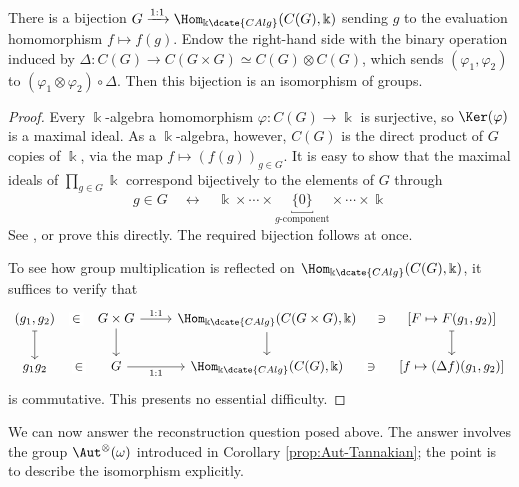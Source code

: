 \begin{lemma}\label{prop:CG-group}
	There is a bijection $G\xrightarrow{1:1}\Hom_{\Bbbk\dcate{CAlg}}(C(G),\Bbbk)$ sending $g$ to the evaluation homomorphism $f\mapsto f(g)$. Endow the right-hand side with the binary operation induced by $\Delta:C(G)\to C(G\times G)\simeq C(G)\otimes C(G)$, which sends $(\varphi_1,\varphi_2)$ to $(\varphi_1\otimes\varphi_2)\circ\Delta$. Then this bijection is an isomorphism of groups.
\end{lemma}
\begin{proof}
	Every $\Bbbk$-algebra homomorphism $\varphi:C(G)\to\Bbbk$ is surjective, so $\Ker(\varphi)$ is a maximal ideal. As a $\Bbbk$-algebra, however, $C(G)$ is the direct product of $G$ copies of $\Bbbk$, via the map $f\mapsto(f(g))_{g\in G}$. It is easy to show that the maximal ideals of $\prod_{g\in G}\Bbbk$ correspond bijectively to the elements of $G$ through
	\[  g \in G \quad \leftrightarrow \quad \Bbbk \times \cdots \times \underbracket{\{0\}}_{\text{$g$-component}} \times \cdots \times \Bbbk \]
	See \cite[Lemma 8.9.7]{Li1}, or prove this directly. The required bijection follows at once.

	To see how group multiplication is reflected on $\Hom_{\Bbbk\dcate{CAlg}}(C(G),\Bbbk)$, it suffices to verify that
	\[\begin{tikzcd}
		(g_1, g_2) \arrow[phantom, r, "\in" description] \arrow[mapsto, d] & G \times G \arrow[r, "1:1"] \arrow[d] & \Hom_{\Bbbk\dcate{CAlg}}(C(G \times G), \Bbbk) \arrow[d] & {[F \mapsto F(g_1, g_2)]} \arrow[phantom, l, "\ni" description, sloped] \arrow[mapsto, d] \\
		g_1 g_2 \arrow[phantom, r, "\in" description] & G \arrow[r, "1:1"'] & \Hom_{\Bbbk\dcate{CAlg}}(C(G), \Bbbk) & {[f \mapsto (\Delta f)(g_1, g_2)]} \arrow[phantom, l, "\ni" description, sloped]
	\end{tikzcd}\]
	is commutative. This presents no essential difficulty.
\end{proof}

We can now answer the reconstruction question posed above. The answer involves the group $\Aut^{\otimes}(\omega)$ introduced in Corollary \ref{prop:Aut-Tannakian}; the point is to describe the isomorphism explicitly.

